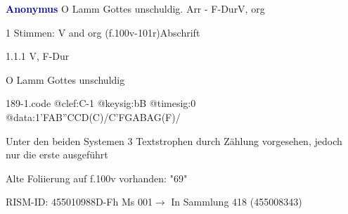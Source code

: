 \documentclass[twocolumn]{book}
\begin{document}
\par \vspace{7pt} \textcolor{darkblue}{\textbf{Anonymus  }}\hfillplus{\textbf{[189]}}\newline O Lamm Gottes unschuldig. Arr - F-Dur\newline V, org
\par \begin{itshape}\end{itshape} 
\par \textcolor{darkblue}{}  1 Stimmen: V and org  (f.100v-101r)\newline Abschrift
\par 1.1.1  V, F-Dur\newline \begin{footnotesize} O Lamm Gottes unschuldig \end{footnotesize}  
\begin{filecontents*}{189-1.code}
@clef:C-1
@keysig:bB
@timesig:0
@data:1'FAB''CCD(C)/C'FGABAG(F)/
\end{filecontents*}
\newline
%
\par Unter den beiden Systemen 3 Textstrophen durch Zählung vorgesehen, jedoch nur die erste ausgeführt
\par Alte Foliierung auf f.100v vorhanden: "69"
\par RISM-ID: 455010988\newline D-Fh  Ms 001\newline $\rightarrow$ In Sammlung 418 (455008343)
      
\end{document}

